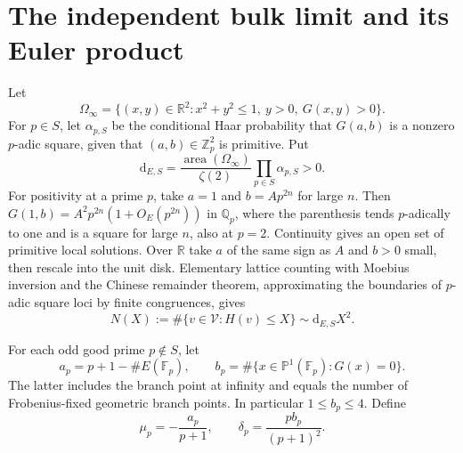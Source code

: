 \documentclass[11pt]{article}
\newcommand{\Q}{\mathbb{Q}}
\newcommand{\R}{\mathbb{R}}
\newcommand{\Z}{\mathbb{Z}}
\newcommand{\F}{\mathbb{F}}
\newcommand{\calV}{\mathcal{V}}
\begin{document}
\section{The independent bulk limit and its Euler product}
Let
\[
 \Omega_\infty=\{(x,y)\in\R^2:x^2+y^2\le1,\ y>0,\ G(x,y)>0\}.
\]
For $p\in S$, let $\alpha_{p,S}$ be the conditional Haar probability that $G(a,b)$ is a nonzero $p$-adic square, given that $(a,b)\in\Z_p^2$ is primitive.  Put
\begin{equation}\label{eq:density}
 \mathrm d_{E,S}=\frac{\operatorname{area}(\Omega_\infty)}{\zeta(2)}
 \prod_{p\in S}\alpha_{p,S}>0.
\end{equation}
For positivity at a prime $p$, take $a=1$ and $b=Ap^{2n}$ for large $n$. Then $G(1,b)=A^2p^{2n}(1+O_E(p^{2n}))$ in $\Q_p$, where the parenthesis tends $p$-adically to one and is a square for large $n$, also at $p=2$. Continuity gives an open set of primitive local solutions. Over $\R$ take $a$ of the same sign as $A$ and $b>0$ small, then rescale into the unit disk. Elementary lattice counting with Moebius inversion and the Chinese remainder theorem, approximating the boundaries of $p$-adic square loci by finite congruences, gives
\begin{equation}\label{eq:allcount}
 N(X):=\#\{v\in\calV:H(v)\le X\}
 \sim\mathrm d_{E,S}X^2.
\end{equation}

For each odd good prime $p\notin S$, let
\[
 a_p=p+1-\#E(\F_p),\qquad
 b_p=\#\{x\in\mathbb P^1(\F_p):G(x)=0\}.
\]
The latter includes the branch point at infinity and equals the number of Frobenius-fixed geometric branch points.  In particular $1\le b_p\le4$.  Define
\begin{equation}\label{eq:localmoments}
 \mu_p=-\frac{a_p}{p+1},\qquad
 \delta_p=\frac{p b_p}{(p+1)^2}.
\end{equation}
\end{document}
